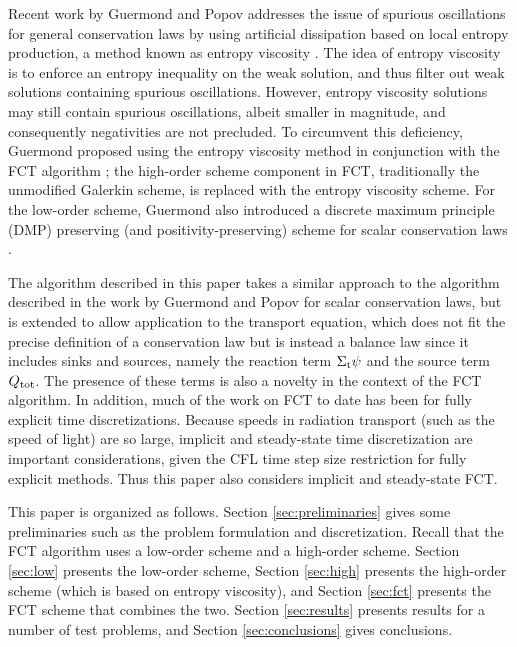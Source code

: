 Recent work by Guermond and Popov addresses the issue of spurious oscillations
for general conservation laws by using artificial dissipation based on
local entropy production, a method known as entropy viscosity \cite{guermond_ev}.
The idea of entropy viscosity is to enforce an entropy inequality on the weak solution,
and thus filter out weak solutions containing spurious oscillations. However,
entropy viscosity solutions may still contain spurious
oscillations, albeit smaller in magnitude, and consequently negativities
are not precluded. To circumvent this deficiency, Guermond proposed using
the entropy viscosity method in conjunction with the FCT
algorithm \cite{guermond_secondorder}; the high-order scheme component in FCT,
traditionally the unmodified Galerkin scheme, is replaced with the entropy
viscosity scheme.
For the low-order
scheme, Guermond also introduced
a discrete maximum principle (DMP) preserving (and positivity-preserving)
scheme for scalar
conservation laws \cite{guermond_firstorder}.

The algorithm described in this paper takes a similar approach to the algorithm
described in the work by Guermond and Popov for scalar conservation laws,
but is extended to allow application to the transport equation,
which does not fit the precise definition of a conservation law but is instead a
balance law since it includes sinks and sources, namely the reaction term
$\Sigma_\textup{t}\psi$ and the source term $Q_\textup{tot}$. The presence
of these terms is also a novelty in the context of the FCT algorithm.
In addition, much of the work on FCT to date has been for fully explicit time
discretizations. Because speeds in radiation transport (such as the speed of light)
are so large, implicit and steady-state time discretization are important
considerations, given the CFL time step size restriction for fully explicit
methods. Thus this paper also considers implicit and steady-state FCT.

This paper is organized as follows. Section \ref{sec:preliminaries} gives
some preliminaries such as the problem formulation and discretization.
Recall that the FCT algorithm uses a low-order scheme and a high-order scheme.
Section \ref{sec:low} presents the low-order scheme, Section \ref{sec:high}
presents the high-order scheme (which is based on entropy viscosity),
and Section \ref{sec:fct} presents the FCT scheme that combines the two. Section
\ref{sec:results} presents results for a number of test problems, and
Section \ref{sec:conclusions} gives conclusions.
